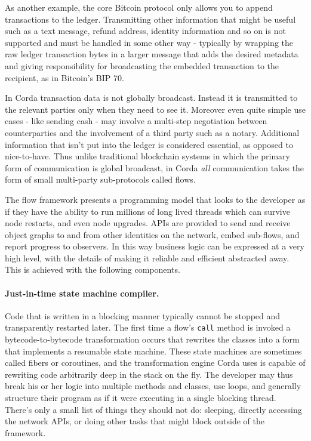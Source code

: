 \documentclass{article}
\begin{document}
As another example, the core Bitcoin protocol only
allows you to append transactions to the ledger. Transmitting other information that might be useful such as a text message,
refund address, identity information and so on is not supported and must be handled in some other way - typically by
wrapping the raw ledger transaction bytes in a larger message that adds the desired metadata and giving responsibility
for broadcasting the embedded transaction to the recipient, as in Bitcoin's BIP 70\cite{BIP70}.

In Corda transaction data is not globally broadcast. Instead it is transmitted to the relevant parties only when they
need to see it. Moreover even quite simple use cases - like sending cash - may involve a multi-step negotiation between
counterparties and the involvement of a third party such as a notary. Additional information that isn't put into the
ledger is considered essential, as opposed to nice-to-have. Thus unlike traditional blockchain systems in which the primary
form of communication is global broadcast, in Corda \emph{all} communication takes the form of small multi-party sub-protocols
called flows.

The flow framework presents a programming model that looks to the developer as if they have the ability to run millions
of long lived threads which can survive node restarts, and even node upgrades. APIs are provided to send and receive
object graphs to and from other identities on the network, embed sub-flows, and report progress to observers. In this
way business logic can be expressed at a very high level, with the details of making it reliable and efficient
abstracted away. This is achieved with the following components.

\paragraph{Just-in-time state machine compiler.}Code that is written in a blocking manner typically cannot be stopped
and transparently restarted later. The first time a flow's \texttt{call} method is invoked a bytecode-to-bytecode
transformation occurs that rewrites the classes into a form that implements a resumable state machine. These state
machines are sometimes called fibers or coroutines, and the transformation engine Corda uses is capable of rewriting
code arbitrarily deep in the stack on the fly. The developer may thus break his or her logic into multiple methods and
classes, use loops, and generally structure their program as if it were executing in a single blocking thread. There's only a
small list of things they should not do: sleeping, directly accessing the network APIs, or doing other tasks that might
block outside of the framework.
\end{document}
